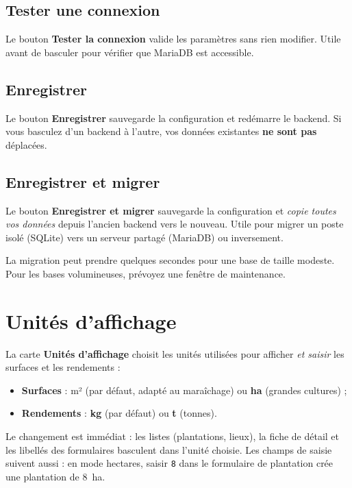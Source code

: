 \subsection{Tester une connexion}

Le bouton \textbf{Tester la connexion} valide les paramètres sans rien modifier. Utile avant de basculer pour vérifier que MariaDB est accessible.

\subsection{Enregistrer}

Le bouton \textbf{Enregistrer} sauvegarde la configuration et redémarre le backend. Si vous basculez d'un backend à l'autre, vos données existantes \textbf{ne sont pas} déplacées.

\subsection{Enregistrer et migrer}

Le bouton \textbf{Enregistrer et migrer} sauvegarde la configuration et \emph{copie toutes vos données} depuis l'ancien backend vers le nouveau. Utile pour migrer un poste isolé (SQLite) vers un serveur partagé (MariaDB) ou inversement.

\begin{warnbox}
La migration peut prendre quelques secondes pour une base de taille modeste. Pour les bases volumineuses, prévoyez une fenêtre de maintenance.
\end{warnbox}

\section{Unités d'affichage}
\label{sec:parametres-unites}

La carte \textbf{Unités d'affichage} choisit les unités utilisées pour afficher \emph{et saisir} les surfaces et les rendements :

\begin{itemize}
  \item \textbf{Surfaces} : m² (par défaut, adapté au maraîchage) ou \textbf{ha} (grandes cultures) ;
  \item \textbf{Rendements} : \textbf{kg} (par défaut) ou \textbf{t} (tonnes).
\end{itemize}

Le changement est immédiat : les listes (plantations, lieux), la fiche de détail et les libellés des formulaires basculent dans l'unité choisie. Les champs de saisie suivent aussi : en mode hectares, saisir \texttt{8} dans le formulaire de plantation crée une plantation de 8~ha.

